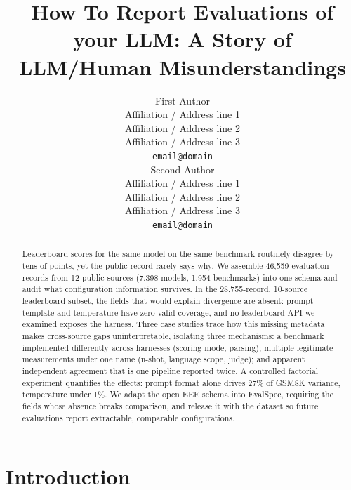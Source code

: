 \documentclass[11pt]{article}
\title{How To Report Evaluations of your LLM: A Story of LLM/Human Misunderstandings}
\author{First Author \\
  Affiliation / Address line 1 \\
  Affiliation / Address line 2 \\
  Affiliation / Address line 3 \\
  \texttt{email@domain} \\\And
  Second Author \\
  Affiliation / Address line 1 \\
  Affiliation / Address line 2 \\
  Affiliation / Address line 3 \\
  \texttt{email@domain} \\}
\begin{document}
\maketitle
\begin{abstract}
Leaderboard scores for the same model on the same benchmark routinely disagree by
tens of points, yet the public record rarely says why. We assemble 46{,}559
evaluation records from 12 public sources (7{,}398 models, 1{,}954 benchmarks) into
one schema and audit what configuration information survives. In the
28{,}755-record, 10-source leaderboard subset, the fields that would explain
divergence are absent: prompt template and temperature have zero valid coverage,
and no leaderboard API we examined exposes the harness. Three case studies trace how this
missing metadata makes cross-source gaps uninterpretable, isolating three
mechanisms: a benchmark implemented differently across harnesses (scoring mode,
parsing); multiple legitimate measurements under one name (n-shot, language scope,
judge); and apparent independent agreement that is one pipeline reported twice. A controlled factorial experiment quantifies the effects: prompt format
alone drives 27\% of GSM8K variance, temperature under 1\%. We adapt the open EEE
schema into EvalSpec, requiring the fields whose absence breaks comparison, and
release it with the dataset so future evaluations report extractable, comparable
configurations.
\end{abstract}

\section{Introduction}
\label{sec:introduction}
\end{document}
